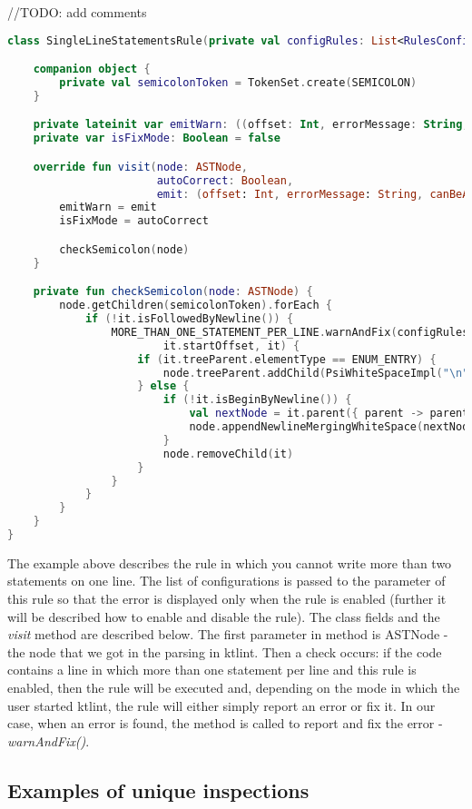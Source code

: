 //TODO: add comments
\begin{lstlisting}[caption={Simple code listing.}, label={lst:example1}, language=Kotlin]
class SingleLineStatementsRule(private val configRules: List<RulesConfig>) : Rule("statement") {

    companion object {
        private val semicolonToken = TokenSet.create(SEMICOLON)
    }

    private lateinit var emitWarn: ((offset: Int, errorMessage: String, canBeAutoCorrected: Boolean) -> Unit)
    private var isFixMode: Boolean = false

    override fun visit(node: ASTNode,
                       autoCorrect: Boolean,
                       emit: (offset: Int, errorMessage: String, canBeAutoCorrected: Boolean) -> Unit) {
        emitWarn = emit
        isFixMode = autoCorrect

        checkSemicolon(node)
    }

    private fun checkSemicolon(node: ASTNode) {
        node.getChildren(semicolonToken).forEach {
            if (!it.isFollowedByNewline()) {
                MORE_THAN_ONE_STATEMENT_PER_LINE.warnAndFix(configRules, emitWarn, isFixMode, it.extractLineOfText(),
                        it.startOffset, it) {
                    if (it.treeParent.elementType == ENUM_ENTRY) {
                        node.treeParent.addChild(PsiWhiteSpaceImpl("\n"), node.treeNext)
                    } else {
                        if (!it.isBeginByNewline()) {
                            val nextNode = it.parent({ parent -> parent.treeNext != null }, strict = false)?.treeNext
                            node.appendNewlineMergingWhiteSpace(nextNode, it)
                        }
                        node.removeChild(it)
                    }
                }
            }
        }
    }
}
\end{lstlisting}

The example above describes the rule in which you cannot write more than two statements on one line. The list of configurations is passed to the parameter of this rule so that the error is displayed only when the rule is enabled (further it will be described how to enable and disable the rule). The class fields and the \textsl{visit} method are described below. The first parameter in method is ASTNode - the node that we got in the parsing in ktlint. Then a check occurs: if the code contains a line in which more than one statement per line and this rule is enabled, then the rule will be executed and, depending on the mode in which the user started ktlint, the rule will either simply report an error or fix it. In our case, when an error is found, the method is called to report and fix the error - \textsl{warnAndFix()}.

\subsection{Examples of unique inspections}
\par
